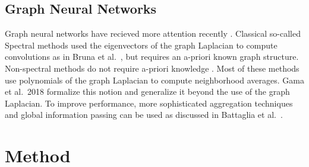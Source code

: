 \documentclass[10pt,twocolumn,letterpaper]{article}
\begin{document}
\subsection{Graph Neural Networks}
Graph neural networks have recieved more attention recently \cite{bronstein2017geometric, bruna2013spectral, defferrard2016convolutional, kipf2016semi, scarselli2009graph, gama2018mimo, gama2018convolutional, battaglia2018relational}.
Classical so-called Spectral methods used the eigenvectors of the graph Laplacian to compute convolutions as in Bruna et al.~\cite{bruna2013spectral}, but requires an a-priori known graph structure. 
Non-spectral methods do not require a-priori knowledge \cite{bronstein2017geometric, kipf2016semi, scarselli2009graph, gama2018convolutional}.
Most of these methods use polynomials of the graph Laplacian to compute neighborhood averages.
Gama et al.~2018 \cite{gama2018mimo, gama2018convolutional} formalize this notion and generalize it beyond the use of the graph Laplacian.
To improve performance, more sophisticated aggregation techniques and global information passing can be used as discussed in Battaglia et al.~\cite{battaglia2018relational}.

\section{Method}
\end{document}
